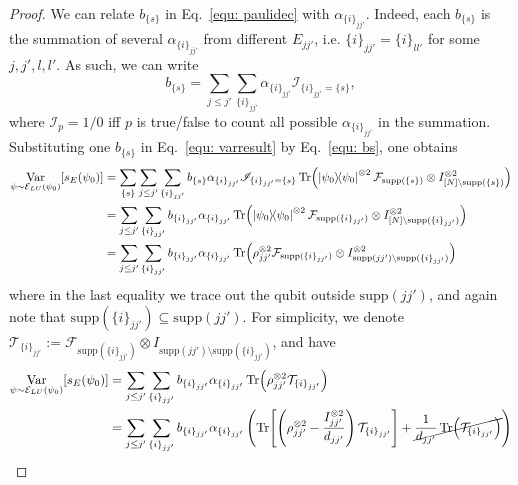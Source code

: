 \documentclass[showpacs,amsmath,amssymb,twocolumn,aps,pra,superscriptaddress,notitlepage,10pt]{revtex4-2}
\newcommand{\cE}{\mathcal E_{LU}}
\newcommand{\supp}{\mathrm{supp}}
\begin{document}
\begin{proof}
    We can relate $b_{\{s\}}$ in Eq.~\eqref{equ: paulidec} with $\alpha_{\{i\}_{jj'}}$.
    Indeed, each $b_{\{s\}}$ is the summation of several $\alpha_{\{i\}_{jj'}}$ from different $E_{jj'}$, i.e. $\{i\}_{jj'}=\{i\}_{ll'}$ for some $j,j',l,l'$. As such, we can write
    \begin{equation}
        b_{\{s\}}=\sum_{j\le j'}\sum_{\{i\}_{jj'}}\alpha_{\{i\}_{jj'}}\mathscr{I}_{\{i\}_{jj'}=\{s\}},\label{equ: bs}
    \end{equation}
    where $\mathscr{I}_p=1/0$ iff $p$ is true/false to count all possible $\alpha_{\{i\}_{jj'}}$ in the summation. Substituting one $b_{\{s\}}$ in Eq.~\eqref{equ: varresult} by Eq.~\eqref{equ: bs}, one obtains
    \begin{equation}
        \begin{aligned}
            \mathop{\mathrm{Var}}_{\psi\sim\cE(\psi_0)}[s_E(\psi_0)]&=\sum_{\{s\}}\sum_{j\le j'}\sum_{\{i\}_{jj'}}b_{\{s\}}\alpha_{\{i\}_{jj'}}\mathscr{I}_{\{i\}_{jj'}=\{s\}}\Tr(\ketbra{\psi_0}{\psi_0}^{\otimes 2}\mathcal F_{\supp(\{s\})}\otimes I_{[N]\setminus\supp(\{s\})}^{\otimes 2})\\
            &=\sum_{j\le j'}\sum_{\{i\}_{jj'}}b_{\{i\}_{jj'}}\alpha_{\{i\}_{jj'}}\Tr(\ketbra{\psi_0}{\psi_0}^{\otimes 2}\mathcal F_{\supp(\{i\}_{jj'})}\otimes I_{[N]\setminus\supp(\{i\}_{jj'})}^{\otimes 2})\\
            &=\sum_{j\le j'}\sum_{\{i\}_{jj'}}b_{\{i\}_{jj'}}\alpha_{\{i\}_{jj'}}\Tr(\rho_{jj'}^{\otimes 2}\mathcal F_{\supp(\{i\}_{jj'})}\otimes I_{\supp(jj')\setminus\supp(\{i\}_{jj'}) }^{\otimes 2})
        \end{aligned}\notag
    \end{equation}
    where in the last equality we trace out the qubit outside $\supp(jj')$, and again note that $\supp(\{i\}_{jj'})\subseteq\supp(jj')$.
    For simplicity, we denote $\mathcal T_{\{i\}_{jj'}}:=\mathcal F_{\supp(\{i\}_{jj'})}\otimes I_{\supp(jj')\setminus\supp(\{i\}_{jj'})}$, and have
    \begin{equation}
        \begin{aligned}
            \mathop{\mathrm{Var}}_{\psi\sim\cE(\psi_0)}[s_E(\psi_0)]&=\sum_{j\le j'}\sum_{\{i\}_{jj'}}b_{\{i\}_{jj'}}\alpha_{\{i\}_{jj'}}\Tr(\rho_{jj'}^{\otimes 2}\mathcal T_{\{i\}_{jj'}})\\
            &=\sum_{j\le j'}\sum_{\{i\}_{jj'}}b_{\{i\}_{jj'}}\alpha_{\{i\}_{jj'}}\left(\Tr[\left(\rho_{jj'}^{\otimes 2}-\frac{I_{jj'}^{\otimes 2}}{d_{jj'}}\right)\mathcal T_{\{i\}_{jj'}}]+\cancel{\frac{1}{d_{jj'}}\Tr(\mathcal T_{\{i\}_{jj'}})}\right)\\

\end{aligned}
\end{equation}
\end{proof}
\end{document}
